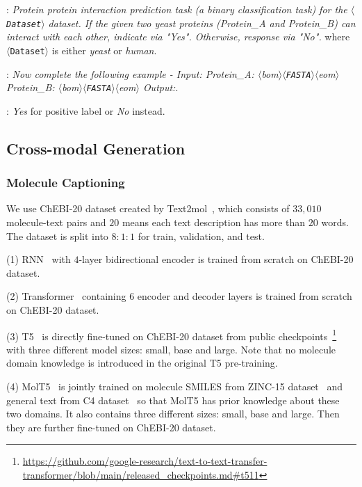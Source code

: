 \documentclass[11pt]{article}
\newcommand{\bop}{$\langle$bom$\rangle$}
\newcommand{\eop}{$\langle$eom$\rangle$}
\newcommand{\dataset}{$\langle$\texttt{Dataset}$\rangle$}
\newcommand{\fasta}{$\langle$\texttt{FASTA}$\rangle$}
\begin{document}

:
\textit{Protein protein interaction prediction task (a binary classification task) for the \dataset{} dataset. If the given two yeast proteins (Protein\_A and Protein\_B) can interact with each other, indicate via "Yes". Otherwise, response via "No".} where \dataset{} is either \textit{yeast} or \textit{human}.

:
\textit{Now complete the following example - Input: Protein\_A: \bop{}\fasta{}\eop{} Protein\_B: \bop{}\fasta{}\eop{} Output:}.

:
\textit{Yes} for positive label or \textit{No} instead.


\subsection{Cross-modal Generation}
\subsubsection{Molecule Captioning}
\label{sec:mol2text_detail}

\noindent We use ChEBI-20 dataset created by Text2mol~\citep{DBLP:conf/emnlp/EdwardsZJ21}, which consists of $33,010$ molecule-text pairs and $20$ means each text description has more than $20$ words.
The dataset is split into $8:1:1$ for train, validation, and test.


\noindent(1) RNN~\citep{medsker2001recurrent} with $4$-layer bidirectional encoder is trained from scratch on ChEBI-20 dataset.

\noindent(2) Transformer~\citep{vaswani2017attention} containing $6$ encoder and decoder layers is trained from scratch on ChEBI-20 dataset.

\noindent(3) T5~\citep{raffel2020exploring} is directly fine-tuned on ChEBI-20 dataset from public checkpoints~\footnote{\url{https://github.com/google-research/text-to-text-transfer-transformer/blob/main/released_checkpoints.md\#t511}} with three different model sizes: small, base and large. Note that no molecule domain knowledge is introduced in the original T5 pre-training.

\noindent(4) MolT5~\citep{DBLP:conf/emnlp/EdwardsLRHCJ22} is jointly trained on molecule SMILES from ZINC-15 dataset~\citep{DBLP:journals/jcisd/SterlingI15} and general text from C4 dataset~\citep{raffel2020exploring} so that MolT5 has prior knowledge about these two domains. It also contains three different sizes: small, base and large. Then they are further fine-tuned on ChEBI-20 dataset.
\end{document}
